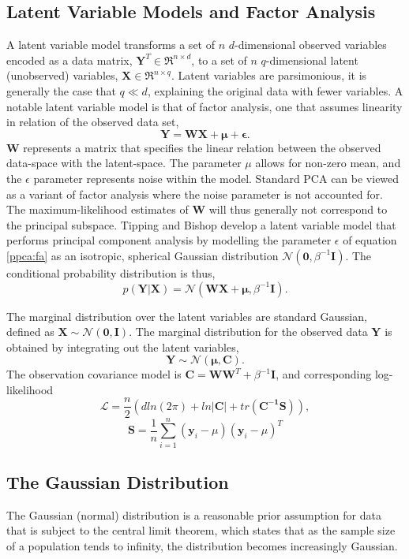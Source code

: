 \documentclass[ %
                    author={Dillon Keith Diep [INCOMPLETE DRAFT, NOT FOR SUBMISSION]},
                supervisor={Dr. Carl Henrik Ek},
                    degree={MEng},
                     title={ARt-CG:},
                  subtitle={Assisted Real-time Content Generation of 3D Hair by Learning Manifolds},
                      type={Research},
                      year={2014} ]{dissertation}
\begin{document}
\subsection{Latent Variable Models and Factor Analysis}
A latent variable model transforms a set of $n$ $d$-dimensional observed variables encoded as a data matrix, $\mathbf{Y}^T\in\Re^{n \times d}$, to a set of $n$ $q$-dimensional latent (unobserved) variables, $\mathbf{X}\in\Re^{n \times q}$. Latent variables are parsimonious, it is generally the case that $q \ll d$, explaining the original data with fewer variables. A notable latent variable model is that of factor analysis, one that assumes linearity in relation of the observed data set,
\begin{equation} \label{ppca:fa}
	\mathbf{Y=WX+\mu+\epsilon}.
\end{equation}
$\mathbf{W}$ represents a matrix that specifies the linear relation between the observed data-space with the latent-space.
The parameter $\mu$ allows for non-zero mean, and the $\epsilon$ parameter represents noise within the model. Standard PCA can be viewed as a variant of factor analysis where the noise parameter is not accounted for. The maximum-likelihood estimates of $\mathbf{W}$ will thus generally not correspond to the principal subspace. Tipping and Bishop develop a latent variable model that performs principal component analysis by modelling the parameter $\epsilon$ of equation \ref{ppca:fa} as an isotropic, spherical Gaussian distribution $\mathcal{N}(\mathbf{0},\beta^{-1}\mathbf{I})$. The conditional probability distribution is thus,
\begin{equation} \label{ppca:conditional}
	p(\mathbf{Y|X})=\mathcal{N}(\mathbf{WX+\mu},\beta^{-1}\mathbf{I}). 
\end{equation}

The marginal distribution over the latent variables are standard Gaussian, defined as $\mathbf{X\sim\mathcal{N}(0,I)}$. The marginal distribution for the observed data $\mathbf{Y}$ is obtained by integrating out the latent variables,
$$\mathbf{Y}\sim\mathcal{N}\mathbf{(\mu,C)}.$$
The observation covariance model is $\mathbf{C=WW}^T+\beta^{-1}\mathbf{I}$, and corresponding log-likelihood
\begin{equation} \label{ppca:loglikelihood}
	\mathcal{L}=\frac{n}{2}(d ln(2\pi)+ln|\mathbf{C}|+tr(\mathbf{C^{-1}S})),
\end{equation}
$$\mathbf{S}=\frac{1}{n}\sum^n_{i=1}(\mathbf{y}_i-\mu)(\mathbf{y}_i-\mu)^T$$

\subsection{The Gaussian Distribution}
The Gaussian (normal) distribution is a reasonable prior assumption for data that is subject to the central limit theorem, which states that as the sample size of a population tends to infinity, the distribution becomes increasingly Gaussian. \cite{bishop}
\end{document}
